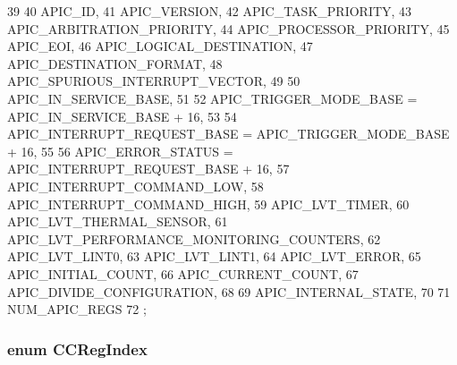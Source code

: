 \begin{DoxyCode}
39     {
40         APIC_ID,
41         APIC_VERSION,
42         APIC_TASK_PRIORITY,
43         APIC_ARBITRATION_PRIORITY,
44         APIC_PROCESSOR_PRIORITY,
45         APIC_EOI,
46         APIC_LOGICAL_DESTINATION,
47         APIC_DESTINATION_FORMAT,
48         APIC_SPURIOUS_INTERRUPT_VECTOR,
49 
50         APIC_IN_SERVICE_BASE,
51 
52         APIC_TRIGGER_MODE_BASE = APIC_IN_SERVICE_BASE + 16,
53 
54         APIC_INTERRUPT_REQUEST_BASE = APIC_TRIGGER_MODE_BASE + 16,
55 
56         APIC_ERROR_STATUS = APIC_INTERRUPT_REQUEST_BASE + 16,
57         APIC_INTERRUPT_COMMAND_LOW,
58         APIC_INTERRUPT_COMMAND_HIGH,
59         APIC_LVT_TIMER,
60         APIC_LVT_THERMAL_SENSOR,
61         APIC_LVT_PERFORMANCE_MONITORING_COUNTERS,
62         APIC_LVT_LINT0,
63         APIC_LVT_LINT1,
64         APIC_LVT_ERROR,
65         APIC_INITIAL_COUNT,
66         APIC_CURRENT_COUNT,
67         APIC_DIVIDE_CONFIGURATION,
68 
69         APIC_INTERNAL_STATE,
70 
71         NUM_APIC_REGS
72     };
\end{DoxyCode}
\hypertarget{namespaceX86ISA_ac8fc3c727b3f9650424d1091e300aab7}{
\subsubsection[{CCRegIndex}]{\setlength{\rightskip}{0pt plus 5cm}enum {\bf CCRegIndex}}}
\label{namespaceX86ISA_ac8fc3c727b3f9650424d1091e300aab7}
